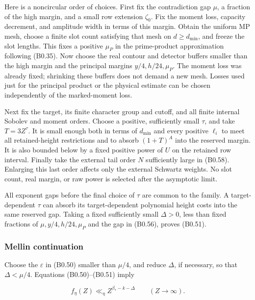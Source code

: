 \documentclass[11pt,a4paper]{article}
\begin{document}
Here is a noncircular order of choices. First fix the contradiction gap
\(\mu\), a fraction of the high margin, and a small row extension
\(\zeta_0\). Fix the moment loss, capacity decrement, and amplitude
width in terms of this margin. Obtain the uniform MP mesh, choose a
finite slot count satisfying that mesh on \(d\ge d_{\min}\), and freeze
the slot lengths. This fixes a positive \(\mu_P\) in the prime-product
approximation following (B0.35). Now choose the real contour and
detector buffers smaller than the high margin and the principal margins
\(y/4,\allowbreak{}h/24,\allowbreak{}\mu_P\). The moment loss was already fixed; shrinking these
buffers does not demand a new mesh. Losses used just for the principal
product or the physical estimate can be chosen independently of the
marked-moment loss.

Next fix the target, its finite character group and cutoff, and all
finite internal Sobolev and moment orders. Choose a positive,
sufficiently small \(\tau\), and take \(T=3Z^\tau\). It is small enough
both in terms of \(d_{\min}\) and every positive \(\ell_i\) to meet all
retained-height restrictions and to absorb \((1+T)^A\) into the reserved
margin. It is also bounded below by a fixed positive power of \(U\) on
the retained row interval. Finally take the external tail order \(N\)
sufficiently large in (B0.58). Enlarging this last order affects only
the external Schwartz weights. No slot count, real margin, or raw power
is selected after the asymptotic limit.

All exponent gaps before the final choice of \(\tau\) are common to the
family. A target-dependent \(\tau\) can absorb its target-dependent
polynomial height costs into the same reserved gap. Taking a fixed
sufficiently small \(\Delta>0\), less than fixed fractions of
\(\mu,\allowbreak{}y/4,\allowbreak{}h/24,\allowbreak{}\mu_P\) and the gap in (B0.56), proves (B0.51).

\hypertarget{mellin-continuation}{%
\subsubsection{Mellin continuation}\label{mellin-continuation}}

Choose the \(\varepsilon\) in (B0.50) smaller than \(\mu/4\), and reduce
\(\Delta\), if necessary, so that \(\Delta<\mu/4\). Equations
(B0.50)--(B0.51) imply

\[
f_\eta(Z)\ll_\eta Z^{\beta_*-k-\Delta}\qquad(Z\longrightarrow\infty).
\tag{B0.59}
\]
\end{document}
